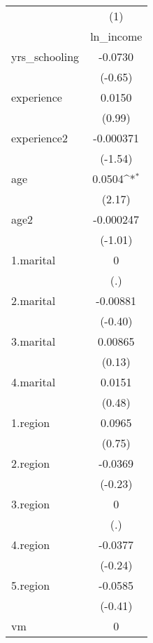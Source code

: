 {
\def\sym#1{\ifmmode^{#1}\else\(^{#1}\)\fi}
\begin{tabular}{l*{1}{c}}
\hline\hline
            &\multicolumn{1}{c}{(1)}\\
            &\multicolumn{1}{c}{ln\_income}\\
\hline
yrs\_schooling&     -0.0730         \\
            &     (-0.65)         \\
[1em]
experience  &      0.0150         \\
            &      (0.99)         \\
[1em]
experience2 &   -0.000371         \\
            &     (-1.54)         \\
[1em]
age         &      0.0504\sym{*}  \\
            &      (2.17)         \\
[1em]
age2        &   -0.000247         \\
            &     (-1.01)         \\
[1em]
1.marital   &           0         \\
            &         (.)         \\
[1em]
2.marital   &    -0.00881         \\
            &     (-0.40)         \\
[1em]
3.marital   &     0.00865         \\
            &      (0.13)         \\
[1em]
4.marital   &      0.0151         \\
            &      (0.48)         \\
[1em]
1.region    &      0.0965         \\
            &      (0.75)         \\
[1em]
2.region    &     -0.0369         \\
            &     (-0.23)         \\
[1em]
3.region    &           0         \\
            &         (.)         \\
[1em]
4.region    &     -0.0377         \\
            &     (-0.24)         \\
[1em]
5.region    &     -0.0585         \\
            &     (-0.41)         \\
[1em]
vm          &           0         \\

\end{tabular}}
